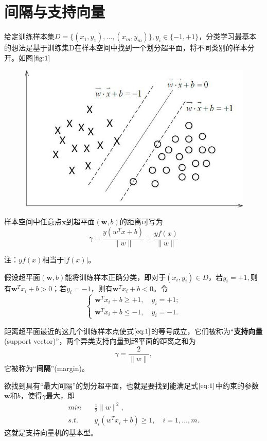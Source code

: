 \section{间隔与支持向量}
给定训练样本集$D=\{(x_1,y_1),\dots,(x_m,y_m)\},y_i\in \{-1,+1\}$，分类学习最基本的想法是基于训练集D在样本空间中找到一个划分超平面，将不同类别的样本分开。如图$\ref{fig:1}$
\begin{figure}
	\centering
	\includegraphics[width=0.7\linewidth]{chapter/统计机器学习/支持向量机/1}
	\caption{}
	\label{fig:1}
\end{figure}

样本空间中任意点$\boldsymbol{x}$到超平面$(\boldsymbol{w},b)$的距离可写为
$$\gamma = \frac{y(w^T x + b)}{\lVert w\rVert} = \frac{yf(x)}{\lVert w \rVert}$$

注：$yf(x)$相当于$\lvert f(x) \rvert$。

假设超平面$(\boldsymbol{w},b)$能将训练样本正确分类，即对于$(x_i,y_i)\in D$，若$y_i=+1,$则有$\boldsymbol{w}^Tx_i+b>0$；若$y_i=-1$，则有$\boldsymbol{w}^Tx_i+b<0$。令
\begin{equation}
\label{eq:1}
\begin{cases} 
\boldsymbol{w}^Tx_i+b\geq +1,\quad y_i=+1;\\
\boldsymbol{w}^Tx_i+b\leq -1,\quad y_i=-1.
\end{cases}
\end{equation}

距离超平面最近的这几个训练样本点使式$\ref{eq:1}$的等号成立，它们被称为“\textbf{支持向量}(support vector)”，两个异类支持向量到超平面的距离之和为
\begin{equation}
	\label{eq:2}
	\gamma = \frac{2}{\lVert w \rVert},
\end{equation}
它被称为“\textbf{间隔}”(margin)。

欲找到具有“最大间隔”的划分超平面，也就是要找到能满足式$\ref{eq:1}$中约束的参数$\boldsymbol{w}$和$b$，使得$\gamma$最大，即
\begin{equation}
	\label{eq:3}
	\begin{aligned}
	min \quad &\frac{1}{2}\lVert w \rVert^2, \\
	s.t. \quad & y_i (w^Tx _i + b) \geq 1, \quad i = 1,\dots, m.
	\end{aligned}
\end{equation}
这就是支持向量机的基本型。

